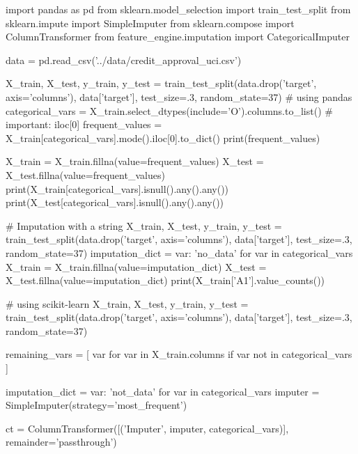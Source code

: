 \begin{pyc}
import pandas as pd
from sklearn.model_selection import train_test_split
from sklearn.impute import SimpleImputer
from sklearn.compose import ColumnTransformer
from feature_engine.imputation import CategoricalImputer

data = pd.read_csv('../data/credit_approval_uci.csv')

X_train, X_test, y_train, y_test = train_test_split(data.drop('target',
                                                                axis='columns'),
                                                    data['target'],
                                                    test_size=.3,
                                                    random_state=37)
# using pandas
categorical_vars = X_train.select_dtypes(include='O').columns.to_list()
# important: iloc[0]
frequent_values = X_train[categorical_vars].mode().iloc[0].to_dict()
print(frequent_values)

X_train = X_train.fillna(value=frequent_values)
X_test = X_test.fillna(value=frequent_values)
print(X_train[categorical_vars].isnull().any().any())
print(X_test[categorical_vars].isnull().any().any())

# Imputation with a string
X_train, X_test, y_train, y_test = train_test_split(data.drop('target',
                                                                axis='columns'),
                                                    data['target'],
                                                    test_size=.3,
                                                    random_state=37)
imputation_dict = {var: 'no_data' for var in categorical_vars}
X_train = X_train.fillna(value=imputation_dict)
X_test = X_test.fillna(value=imputation_dict)
print(X_train['A1'].value_counts())

# using scikit-learn
X_train, X_test, y_train, y_test = train_test_split(data.drop('target',
                                                                axis='columns'),
                                                    data['target'],
                                                    test_size=.3,
                                                    random_state=37)

remaining_vars = [
    var for var in X_train.columns if var not in categorical_vars
]

imputation_dict = {var: 'not_data' for var in categorical_vars}
imputer = SimpleImputer(strategy='most_frequent')

ct = ColumnTransformer([('Imputer', imputer, categorical_vars)],
                        remainder='passthrough')


\end{pyc}
